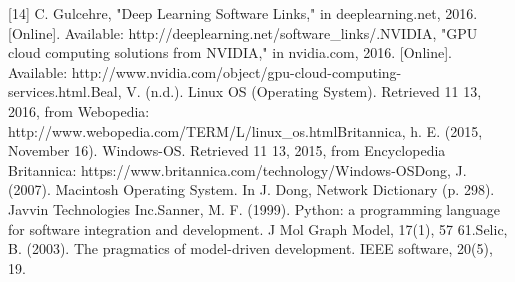 \documentclass{scrreprt}
\begin{document}
[14] C. Gulcehre, "Deep Learning Software Links," in deeplearning.net, 2016. [Online]. Available: http://deeplearning.net/software_links/.\newline
[15] NVIDIA, "GPU cloud computing solutions from NVIDIA," in nvidia.com, 2016. [Online]. Available: http://www.nvidia.com/object/gpu-cloud-computing-services.html.\newline
[16] Beal, V. (n.d.). Linux OS (Operating System). Retrieved 11 13, 2016, from Webopedia: http://www.webopedia.com/TERM/L/linux_os.html\newline
[17] Britannica, h. E. (2015, November 16). Windows-OS. Retrieved 11 13, 2015, from Encyclopedia Britannica: https://www.britannica.com/technology/Windows-OS\newline
[18] Dong, J. (2007). Macintosh Operating System. In J. Dong, Network Dictionary (p. 298). Javvin Technologies Inc.\newline
[19] Sanner, M. F. (1999). Python: a programming language for software integration and	development. J Mol Graph Model, 17(1), 57 61.\newline
[20] Selic, B. (2003). The pragmatics of model-driven development. IEEE software, 20(5), 19.\newline
\end{document}
